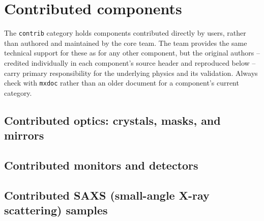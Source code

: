 
\chapter{Contributed components}
\label{c:contrib}

The \texttt{contrib} category holds components contributed directly by
\MCX users, rather than authored and maintained by the core \MCX team.
The \MCX team provides the same technical support for these as for any
other component, but the original authors -- credited individually in each
component's source header and reproduced below -- carry primary
responsibility for the underlying physics and its validation. Always
check with \verb+mxdoc+ rather than an older document for a component's
current category.

\section{Contributed optics: crystals, masks, and mirrors}







\section{Contributed monitors and detectors}




\section{Contributed SAXS (small-angle X-ray scattering) samples}












